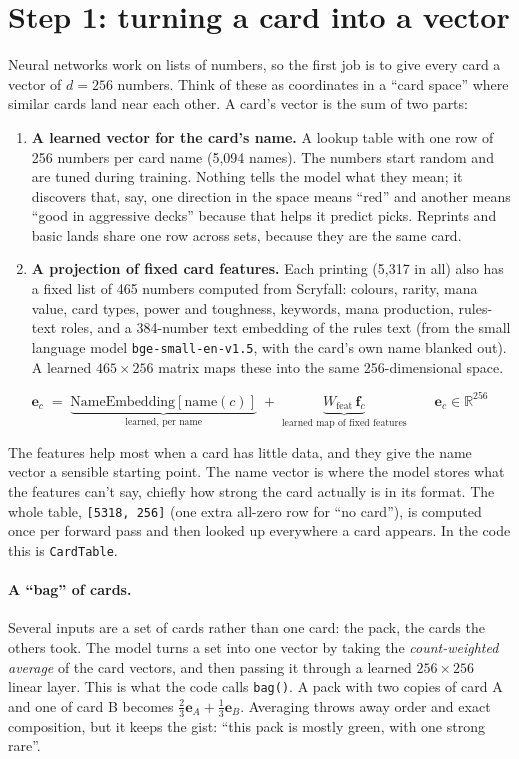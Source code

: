 \documentclass[11pt,letterpaper]{article}
\newcommand{\code}[1]{\texttt{\small #1}}
\newcommand{\shape}[1]{\texttt{\footnotesize[#1]}}
\begin{document}
\section{Step 1: turning a card into a vector}\label{sec:cards}

Neural networks work on lists of numbers, so the first job is to give every card a vector of $d=256$
numbers. Think of these as coordinates in a ``card space'' where similar cards land near each other. A card's
vector is the sum of two parts:

\begin{enumerate}
\item \textbf{A learned vector for the card's name.} A lookup table with one row of 256 numbers per
card name (5,094 names). The numbers start random and are tuned during training. Nothing tells the model
what they mean; it discovers that, say, one direction in the space means ``red'' and another means
``good in aggressive decks'' because that helps it predict picks. Reprints and basic lands share one row
across sets, because they are the same card.
\item \textbf{A projection of fixed card features.} Each printing (5,317 in all) also has a fixed list
of 465 numbers computed from Scryfall: colours, rarity, mana value, card types, power and toughness,
keywords, mana production, rules-text roles, and a 384-number text embedding of the rules text (from the
small language model \code{bge-small-en-v1.5}, with the card's own name blanked out). A learned
$465\times256$ matrix maps these into the same 256-dimensional space.
\end{enumerate}

\[
\mathbf{e}_c \;=\; \underbrace{\text{NameEmbedding}[\text{name}(c)]}_{\text{learned, per name}}
\;+\; \underbrace{W_{\text{feat}}\,\mathbf{f}_c}_{\text{learned map of fixed features}}
\qquad \mathbf{e}_c \in \mathbb{R}^{256}
\]

The features help most when a card has little data, and they give the name vector a sensible starting
point. The name vector is where the model stores what the features can't say, chiefly how strong the card
actually is in its format. The whole table, \shape{5318, 256} (one extra all-zero row for ``no card''), is
computed once per forward pass and then looked up everywhere a card appears. In the code this is
\code{CardTable}.

\paragraph{A ``bag'' of cards.} Several inputs are a set of cards rather than one card: the pack, the
cards the others took. The model turns a set into one vector by taking the \emph{count-weighted average}
of the card vectors, and then passing it through a learned $256\times256$ linear layer. This is what the
code calls \code{bag()}. A pack with two copies of card A and one of card B becomes
$\tfrac{2}{3}\mathbf{e}_A + \tfrac{1}{3}\mathbf{e}_B$. Averaging throws away order and exact
composition, but it keeps the gist: ``this pack is mostly green, with one strong rare''.
\end{document}
